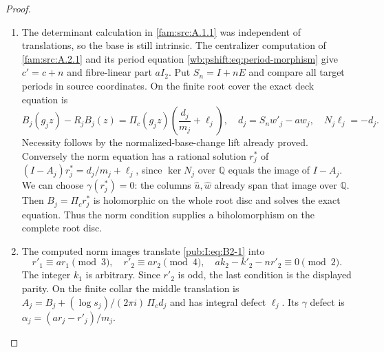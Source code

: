 \begin{proof}
\begin{enumerate}[label=\arabic*.,leftmargin=*]
\item The determinant calculation in \ref{fam:src:A.1.1} was independent of translations, so the base is still intrinsic. The centralizer computation of \cref{fam:src:A.2.1} and its period equation \eqref{wb:pshift:eq:period-morphism} give $c'=c+n$ and fibre-linear part $aI_2$. Put $S_n=I+nE$ and compare all target periods in source coordinates. On the finite root cover the exact deck equation is
\begin{equation}
 B_j(g_jz)-R_jB_j(z)=\Pi_c(g_jz)\left(\frac{d_j}{m_j}+\ell_j\right),
 \quad d_j=S_nw'_j-a w_j,
 \quad N_j\ell_j=-d_j.
\label{pub:I:eq:B2-1}
\end{equation}
Necessity follows by the normalized-base-change lift already proved. Conversely the norm equation has a rational solution $r_j^*$ of
$(I-A_j)r_j^*=d_j/m_j+\ell_j$, since $\ker N_j$ over $\mathbb Q$ equals the image of $I-A_j$. We can choose $\gamma(r_j^*)=0$: the columns $\widehat u,\widehat w$ already span that image over $\mathbb Q$. Then $B_j=\Pi_cr_j^*$ is holomorphic on the whole root disc and solves the exact equation. Thus the norm condition supplies a biholomorphism on the complete root disc.

\item The computed norm images translate \eqref{pub:I:eq:B2-1} into
\begin{equation}
 r'_1\equiv ar_1\pmod3,\quad r'_2\equiv ar_2\pmod4,
 \quad ak_2-k'_2-nr'_2\equiv0\pmod2.
\label{pub:I:eq:B2-2}
\end{equation}
The integer $k_1$ is arbitrary. Since $r'_2$ is odd, the last condition is the displayed parity. On the finite collar the middle translation is
$A_j=B_j+(\log s_j)/(2\pi i)\,\Pi_cd_j$ and has integral defect $\ell_j$. Its $\gamma$ defect is
$\alpha_j=(ar_j-r'_j)/m_j$.


\end{enumerate}
\end{proof}
